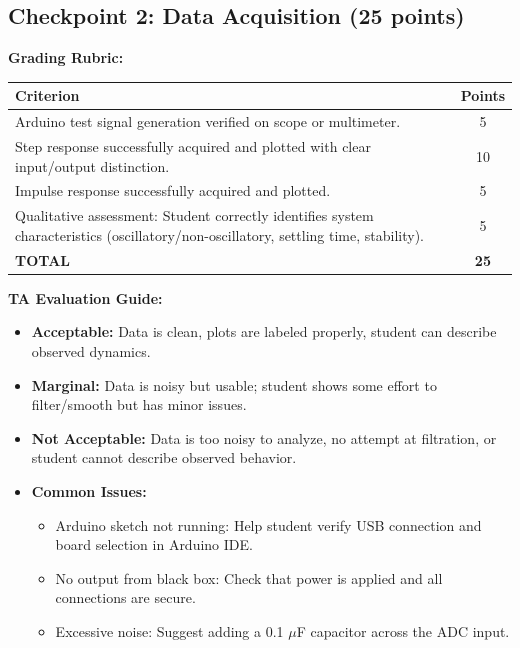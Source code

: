 \documentclass[11pt,letterpaper]{article}
\begin{document}
\subsection{Checkpoint 2: Data Acquisition (25 points)}

\textbf{Grading Rubric:}

\begin{center}
\begin{tabularx}{0.95\textwidth}{|X|c|}
\hline
\textbf{Criterion} & \textbf{Points} \\
\hline
Arduino test signal generation verified on scope or multimeter. & 5 \\
\hline
Step response successfully acquired and plotted with clear input/output distinction. & 10 \\
\hline
Impulse response successfully acquired and plotted. & 5 \\
\hline
Qualitative assessment: Student correctly identifies system characteristics (oscillatory/non-oscillatory, settling time, stability). & 5 \\
\hline
\textbf{TOTAL} & \textbf{25} \\
\hline
\end{tabularx}
\end{center}

\noindent
\textbf{TA Evaluation Guide:}

\begin{itemize}
    \item \textbf{Acceptable:} Data is clean, plots are labeled properly, student can describe observed dynamics.
    \item \textbf{Marginal:} Data is noisy but usable; student shows some effort to filter/smooth but has minor issues.
    \item \textbf{Not Acceptable:} Data is too noisy to analyze, no attempt at filtration, or student cannot describe observed behavior.

    \item \textbf{Common Issues:}
        \begin{itemize}
            \item Arduino sketch not running: Help student verify USB connection and board selection in Arduino IDE.
            \item No output from black box: Check that power is applied and all connections are secure.
            \item Excessive noise: Suggest adding a 0.1 $\mu$F capacitor across the ADC input.
        \end{itemize}
\end{itemize}
\end{document}
